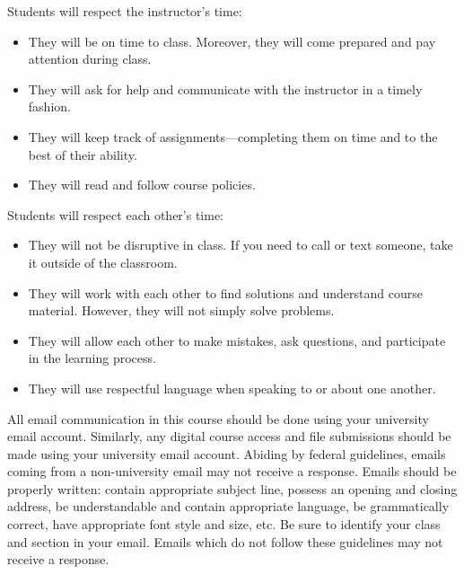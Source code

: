 \documentclass[11pt,letterpaper]{article}
\begin{document}
Students will respect the instructor's time:
	\begin{itemize}
	\item They will be on time to class. Moreover, they will come prepared and pay attention during class. 
	\item They will ask for help and communicate with the instructor in a timely fashion. 
	\item They will keep track of assignments---completing them on time and to the best of their ability.  
	\item They will read and follow course policies. 
	\end{itemize} \pspace

Students will respect each other's time:
	\begin{itemize}
	\item They will not be disruptive in class. If you need to call or text someone, take it outside of the classroom. 
	\item They will work with each other to find solutions and understand course material. However, they will not simply solve problems. 
	\item They will allow each other to make mistakes, ask questions, and participate in the learning process. 
	\item They will use respectful language when speaking to or about one another. 
	\end{itemize}
\sectionbreak





\newpage






All email communication in this course should be done using your university email account. Similarly, any digital course access and file submissions should be made using your university email account. Abiding by federal guidelines, emails coming from a non-university email may not receive a response. Emails should be properly written: contain appropriate subject line, possess an opening and closing address, be understandable and contain appropriate language, be grammatically correct, have appropriate font style and size, etc. Be sure to identify your class and section in your email. Emails which do not follow these guidelines may not receive a response. 
\sectionbreak
\end{document}
